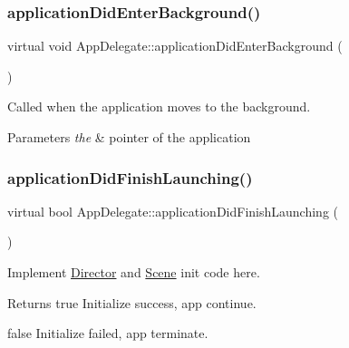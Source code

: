 \subsubsection{\texorpdfstring{application\+Did\+Enter\+Background()}{applicationDidEnterBackground()}\hspace{0.1cm}{\footnotesize\ttfamily [4/4]}}
{\footnotesize\ttfamily virtual void App\+Delegate\+::application\+Did\+Enter\+Background (\begin{DoxyParamCaption}{ }\end{DoxyParamCaption})\hspace{0.3cm}{\ttfamily [virtual]}}



Called when the application moves to the background. 


\begin{DoxyParams}{Parameters}
{\em the} & pointer of the application \\
\hline
\end{DoxyParams}
\mbox{\label{classAppDelegate_a05630e4484204b8e917ae7b8ac4bd6a3}} 
\subsubsection{\texorpdfstring{application\+Did\+Finish\+Launching()}{applicationDidFinishLaunching()}\hspace{0.1cm}{\footnotesize\ttfamily [1/4]}}
{\footnotesize\ttfamily virtual bool App\+Delegate\+::application\+Did\+Finish\+Launching (\begin{DoxyParamCaption}{ }\end{DoxyParamCaption})\hspace{0.3cm}{\ttfamily [virtual]}}



Implement \hyperlink{classDirector}{Director} and \hyperlink{classScene}{Scene} init code here. 

\begin{DoxyReturn}{Returns}
true Initialize success, app continue. 

false Initialize failed, app terminate. 
\end{DoxyReturn}
\mbox{\label{classAppDelegate_a68cbaed49edf7581dc59a09d5062fff3}} 
